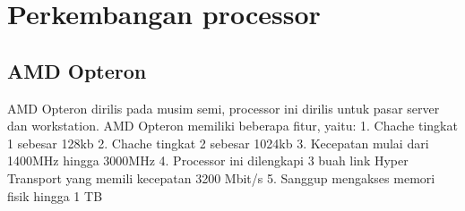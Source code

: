 \section{Perkembangan processor}
	\subsection{AMD Opteron}
	AMD Opteron dirilis pada musim semi, processor ini dirilis untuk pasar server dan workstation. AMD Opteron memiliki beberapa fitur, yaitu:
	1. Chache tingkat 1 sebesar 128kb
	2. Chache tingkat 2 sebesar 1024kb
	3. Kecepatan mulai dari 1400MHz hingga 3000MHz
	4. Processor ini dilengkapi 3 buah link Hyper Transport yang memili kecepatan 3200 Mbit/s
	5. Sanggup mengakses memori fisik hingga 1 TB 
